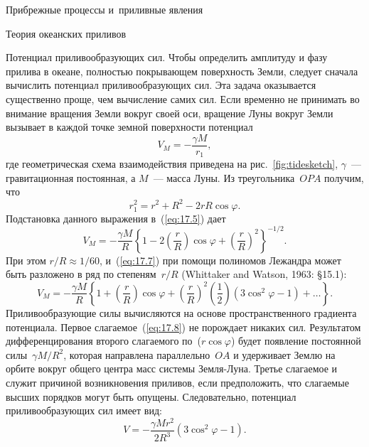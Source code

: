 \begin{chapter}{Прибрежные процессы и~приливные явления}
\begin{section}{Теория океанских приливов}
\begin{paragraph}{Потенциал приливообразующих сил.}
Чтобы определить амплитуду и фазу прилива в океане, полностью покрывающем
поверхность Земли, следует сначала вычислить потенциал приливообразующих 
сил. Эта задача оказывается 
существенно проще, чем вычисление самих сил. Если временно не принимать
во внимание вращения Земли вокруг своей оси, вращение Луны
вокруг Земли вызывает в каждой точке земной поверхности потенциал
\begin{equation}\label{eq:17.5}
  V_{M} = -\frac{\gamma M}{r_{1}},
\end{equation}
где геометрическая схема взаимодействия приведена на рис.~\ref{fig:tidesketch},
$\gamma $~--- гравитационная постоянная, а $M$~--- масса Луны. 
Из треугольника~$OPA$ получим, что
\begin{equation}
  r_{1}^{2} = r^{2} + R^{2} - 2 r R \cos \varphi.
\end{equation}
Подстановка данного выражения в~(\ref{eq:17.5}) дает
\begin{equation}\label{eq:17.7}
  V_{M} = -\frac{\gamma M}{R} 
   \left\{ 1 - 2 \left(\frac{r}{R}\right) \cos \varphi 
           + \left(\frac{r}{R}\right)^{2}\right\}^{-1/2}.
\end{equation}
При этом $r/R \approx 1/60$, и~(\ref{eq:17.7}) при помощи полиномов Лежандра 
может быть разложено в ряд по 
степеням~$r/R$ (Whittaker and Watson, 1963: \S 15.1):
\begin{equation}\label{eq:17.8}
 V_M = -\frac{\gamma M}{R} 
    \left\{1+\left(\frac{r}{R}\right) \cos \varphi 
            +\left(\frac{r}{R}\right)^2 \left(\frac{1}{2}\right) (3\cos ^2 \varphi - 1) 
            + \ldots
    \right\}.
\end{equation}
Приливообразующие силы вычисляются на основе пространственного градиента
потенциала. Первое слагаемое~(\ref{eq:17.8}) не порождает никаких сил.
Результатом дифференцирования второго слагаемого по~($r \cos \varphi $) 
будет появление постоянной силы~$\gamma M/R^{2}$, которая направлена
параллельно~$OA$ и удерживает Землю на орбите вокруг общего центра масс 
системы Земля-Луна. Третье слагаемое и служит причиной возникновения
приливов, если предположить, что слагаемые высших порядков могут быть
опущены. Следовательно, потенциал приливообразующих сил имеет вид:
\begin{equation}\label{eq:17.9}
 V= -\frac{\gamma M r^{2}}{2 R^{3}} (3 \cos ^2 \varphi - 1).
\end{equation}
%

\end{paragraph}
\end{section}
\end{chapter}

